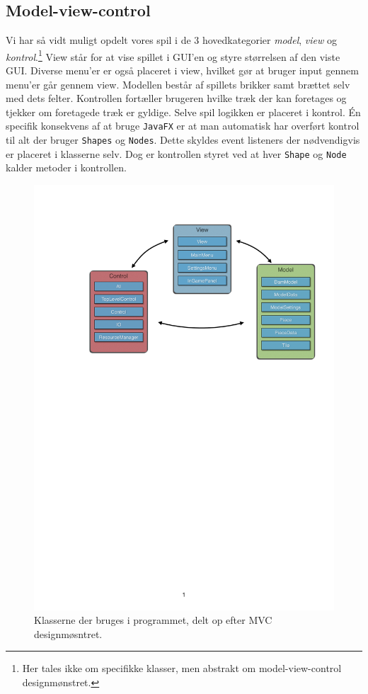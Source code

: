\subsection{Model-view-control}\label{sec:designMVC}

Vi har så vidt muligt opdelt vores spil i de 3 hovedkategorier \textit{model}, \textit{view} og \textit{kontrol}.\footnote{Her tales ikke om specifikke klasser, men abstrakt om model-view-control designmønstret.} View står for at vise spillet i GUI'en og styre størrelsen af den viste GUI. Diverse menu'er er også placeret i view, hvilket gør at bruger input gennem menu'er går gennem view. Modellen består af spillets brikker samt brættet selv med dets felter. Kontrollen fortæller brugeren hvilke træk der kan foretages og tjekker om foretagede træk er gyldige. Selve spil logikken er placeret i kontrol. Én specifik konsekvens af at bruge \texttt{JavaFX} er at man automatisk har overført kontrol til alt der bruger \texttt{Shapes} og \texttt{Nodes}. Dette skyldes event listeners der nødvendigvis er placeret i klasserne selv. Dog er kontrollen styret ved at hver \texttt{Shape} og \texttt{Node} kalder metoder i kontrollen. 

\begin{figure}[H]
\centering
\includegraphics[width = 0.8  \textwidth]{Figurer/Model-View-Control}
\caption{Klasserne der bruges i programmet, delt op efter MVC designmøsntret.}
\label{fig:MVC}
\end{figure}

